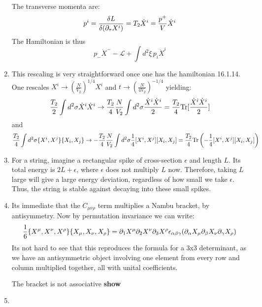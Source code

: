 \documentclass[11pt, class=article, crop=false]{standalone}
\begin{document}
\begin{enumerate}
	The transverse momenta are:
	\[
		p^i = \frac{\delta L}{\delta(\partial_\tau X^i)}= T_2 \dot X^i = \frac{p^+}{V} \dot X^i
	\]
	The Hamiltonian is thus
	\[
		p_- \dot X^- - \mathcal L + \int d^2 \xi \, p_i \dot X^i
	\]
	
	\item This rescaling is very straightforward once one has the hamiltonian 16.1.14. One rescales $X^i \to \left(\frac{N}{V_2}\right)^{1/4} X^i$ and $t \to \left(\frac{N}{4 V_2}\right)^{-1/4}$ yielding:
	\[
		\frac{T_2}{2} \int d^2 \sigma \dot X^i \dot X^i \to \frac{T_2}{4} \frac{N}{V_2} \int d^2 \sigma \frac{\dot X^i \dot X^i}{2} = \frac{T_2}{4} \mathrm{Tr}[\frac{\dot X^i \dot X^i}{2} ]
	\]
	and 
	\[
		\frac{T_2}{4} \int d^2 \sigma  \{X^i, X^j\} \{X_{i}, X_{j}\} \to -\frac{T_2}{4} \frac{N}{V_2} \int d^2 \sigma \frac14 [X^i, X^j] [X_{i}, X_{j}] = \frac{T_2}{4} \mathrm{Tr}\left(-\frac14 [X^i, X^j] [X_{i}, X_{j}] \right)
	\]
	
	\item For a string, imagine a rectangular spike of cross-section $\epsilon$ and length $L$. Its total energy is $2 L + \epsilon$, where $\epsilon$ does not multiply $L$ now. Therefore, taking $L$ large will give a large energy deviation, regardless of how small we take $\epsilon$. Thus, the string is stable against decaying into these small spikes. 
	
	\item Its immediate that the $C_{\mu \nu \rho}$ term multiplies a Nambu bracket, by antisymmetry. Now by permutation invariance we can write:
	\[
		\frac16 \{X^\mu, X^\nu, X^\rho\}  \{X_\mu, X_\nu, X_\rho\} = \partial_1 X^\mu \partial_2 X^\nu \partial_3 X^\rho \epsilon_{\alpha \beta \gamma} (\partial_\alpha X_\mu \partial_\beta X_\nu \partial_\gamma X_\rho)
	\]
	Its not hard to see that this reproduces the formula for a 3x3 determinant, as we have an antisymmetric object involving one element from every row and column multiplied together, all with unital coefficients. 
	
	The bracket is not associative \textbf{show}
	
	\item 
	
\end{enumerate}

\end{document}
